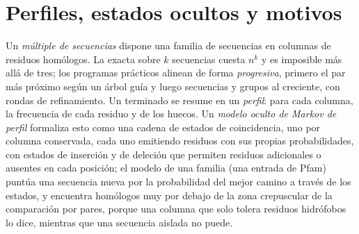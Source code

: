 \section{Perfiles, estados ocultos y motivos}

\begin{definition}\label{def:b3:bioinformatics:msa}
Un \emph{ múltiple de secuencias} dispone una familia de
secuencias en columnas de residuos homólogos. La 
exacta sobre $k$ secuencias cuesta $n^{k}$ y es imposible más allá de
tres; los programas prácticos alinean de forma \emph{progresiva}, primero
el par más próximo según un árbol guía y luego secuencias y grupos al
 creciente, con rondas de refinamiento. Un 
terminado se resume en un \emph{perfil}: para cada columna, la frecuencia
de cada residuo y de los huecos. Un \emph{modelo oculto de Markov de
perfil} formaliza esto como una cadena de estados de coincidencia, uno
por columna conservada, cada uno emitiendo residuos con sus propias
probabilidades, con estados de inserción y de deleción que permiten
residuos adicionales o ausentes en cada posición; el modelo de una
familia (una entrada de Pfam) puntúa una secuencia nueva por la
probabilidad del mejor camino a través de los estados, y encuentra
homólogos muy por debajo de la zona crepuscular de la comparación por
pares, porque una columna que solo tolera residuos hidrófobos lo dice,
mientras que una secuencia aislada no puede.
\end{definition}

